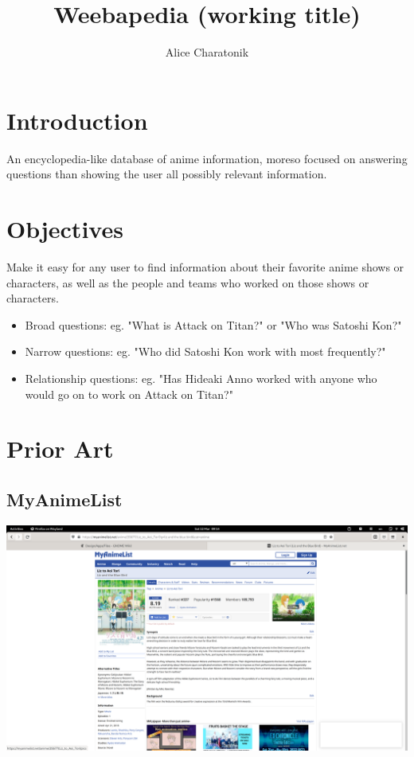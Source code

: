 \documentclass[a4paper]{article}
\title{Weebapedia (working title)}
\author{Alice Charatonik}
\date{}
\begin{document}
\maketitle

\section{Introduction}
An encyclopedia-like database of anime information, moreso focused on answering questions than showing the user all possibly relevant information.

\section{Objectives}
Make it easy for any user to find information about their favorite anime shows or characters, as well as the people and teams who worked on those shows or characters.
\begin{itemize}
  \item Broad questions: eg. "What is Attack on Titan?" or "Who was Satoshi Kon?"
  \item Narrow questions: eg. "Who did Satoshi Kon work with most frequently?"
  \item Relationship questions: eg. "Has Hideaki Anno worked with anyone who would go on to work on Attack on Titan?"
\end{itemize}

\section{Prior Art}
\subsection{MyAnimeList}
\includegraphics[width=\textwidth]{MAL.png}
\end{document}
